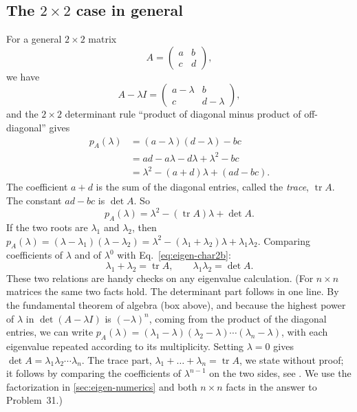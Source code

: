 \subsection{The $2\times2$ case in general}

For a general $2\times2$ matrix
\begin{equation}
A=\begin{pmatrix}a&b\\c&d\end{pmatrix},
\end{equation}
we have
\begin{equation}
A-\lambda I=\begin{pmatrix}a-\lambda&b\\c&d-\lambda\end{pmatrix},
\end{equation}
and the $2\times2$ determinant rule ``product of diagonal minus product of off-diagonal'' gives
\begin{align}
p_A(\lambda)&=(a-\lambda)(d-\lambda)-bc\\
&=ad-a\lambda-d\lambda+\lambda^2-bc\\
&=\lambda^2-(a+d)\lambda+(ad-bc).
\label{eq:eigen-char2}
\end{align}
The coefficient $a+d$ is the sum of the diagonal entries, called the \emph{trace}, $\operatorname{tr}A$. The constant $ad-bc$ is $\det A$. So
\begin{equation}
p_A(\lambda)=\lambda^2-(\operatorname{tr}A)\lambda+\det A.
\label{eq:eigen-char2b}
\end{equation}
If the two roots are $\lambda_1$ and $\lambda_2$, then $p_A(\lambda)=(\lambda-\lambda_1)(\lambda-\lambda_2)=\lambda^2-(\lambda_1+\lambda_2)\lambda+\lambda_1\lambda_2$. Comparing coefficients of $\lambda$ and of $\lambda^0$ with Eq.~\eqref{eq:eigen-char2b}:
\begin{equation}
\lambda_1+\lambda_2=\operatorname{tr}A,\qquad \lambda_1\lambda_2=\det A.
\label{eq:eigen-trdet}
\end{equation}
These two relations are handy checks on any eigenvalue calculation. (For $n\times n$ matrices the same two facts hold. The determinant part follows in one line. By the fundamental theorem of algebra (box above), and because the highest power of $\lambda$ in $\det(A-\lambda I)$ is $(-\lambda)^n$, coming from the product of the diagonal entries, we can write $p_A(\lambda)=(\lambda_1-\lambda)(\lambda_2-\lambda)\cdots(\lambda_n-\lambda)$, with each eigenvalue repeated according to its multiplicity. Setting $\lambda=0$ gives $\det A=\lambda_1\lambda_2\cdots\lambda_n$. The trace part, $\lambda_1+\dots+\lambda_n=\operatorname{tr}A$, we state without proof; it follows by comparing the coefficients of $\lambda^{n-1}$ on the two sides, see \cite{strang}. We use the factorization in \cref{sec:eigen-numerics} and both $n\times n$ facts in the answer to Problem~31.)

